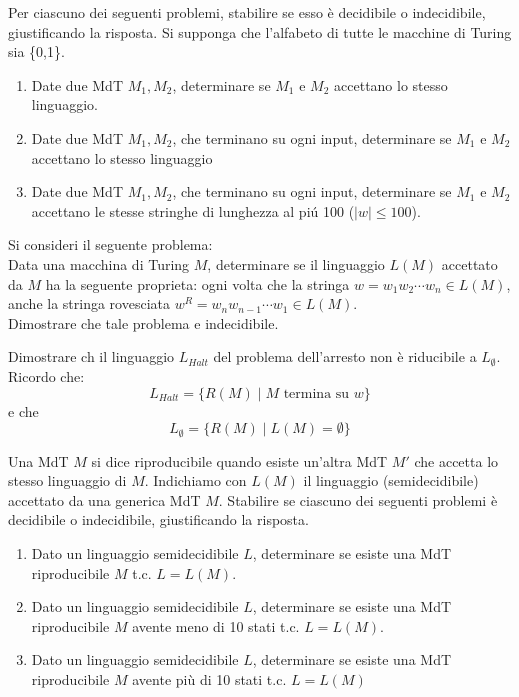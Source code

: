 \documentclass{article}  %
\begin{document}
\begin{esercizio}[Esercizio 6]
    Per ciascuno dei seguenti problemi, stabilire se esso è decidibile o indecidibile, giustificando la risposta.
    Si supponga che l'alfabeto di tutte le macchine di Turing sia \{0,1\}.
    \begin{enumerate}
        \item Date due MdT $M_1, M_2$, determinare se $M_1$ e $M_2$ accettano lo stesso linguaggio.
        \item Date due MdT $M_1, M_2$, che terminano su ogni input, determinare se $M_1$ e $M_2$
        accettano lo stesso linguaggio
        \item Date due MdT $M_1, M_2$, che terminano su ogni input, determinare se $M_1$ e $M_2$
        accettano le stesse stringhe di lunghezza al piú 100 ($|w| \leq 100$).
    \end{enumerate}
\end{esercizio}

\begin{esercizio}[Esercizio 7]
Si consideri il seguente problema: \\
 Data una macchina di Turing $M$, determinare se il linguaggio $L(M)$
 accettato da $M$ ha la seguente proprieta: ogni volta che la stringa
 $w =w_1w_2 \cdots w_n \in L(M)$, anche la stringa rovesciata
 $w^R =w_nw_{n-1} \cdots w_1 \in L(M)$. \\
 Dimostrare che tale problema e indecidibile.
\end{esercizio}

\begin{esercizio}[Esercizio 8]
    Dimostrare ch il linguaggio $L_{Halt}$ del problema dell'arresto non è riducibile
    a $L_{\emptyset}$. \\
    Ricordo che:
    \[
    L_{Halt}=\{R(M) \mid M \text{ termina su } w\}
    \]
    e che 
    \[
    L_{\emptyset} = \{R(M) \mid L(M)=\emptyset\}
    \]
\end{esercizio}

\begin{esercizio}[Esercizio 9]
    Una MdT $M$ si dice riproducibile quando esiste un'altra MdT $M'$ che accetta lo stesso 
    linguaggio di $M$. Indichiamo con $L(M)$ il linguaggio (semidecidibile) accettato da una 
    generica MdT $M$. Stabilire se ciascuno dei seguenti problemi è decidibile o indecidibile, giustificando la risposta.
    \begin{enumerate}
        \item Dato un linguaggio semidecidibile $L$, determinare se esiste una MdT riproducibile $M$ t.c. $L=L(M)$.
        \item Dato un linguaggio semidecidibile $L$, determinare se esiste una MdT riproducibile $M$ avente meno di 10 stati t.c. $L=L(M)$.
        \item Dato un linguaggio semidecidibile $L$, determinare se esiste una MdT riproducibile $M$ avente più di 10 stati t.c. $L=L(M)$
    \end{enumerate}
\end{esercizio}
\end{document}
